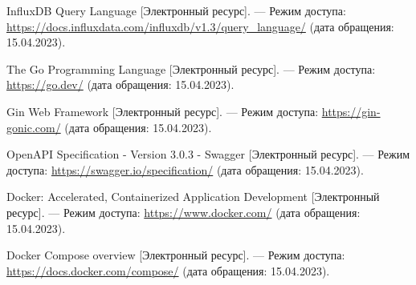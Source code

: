 \begin{thebibliography}{}
	 InfluxDB Query Language [Электронный ресурс]. — Режим доступа: \url{https://docs.influxdata.com/influxdb/v1.3/query_language/} (дата обращения: 15.04.2023).
	 
	 The Go Programming Language [Электронный ресурс]. — Режим доступа: \url{https://go.dev/} (дата обращения: 15.04.2023).
	 
	 Gin Web Framework [Электронный ресурс]. — Режим доступа: \url{https://gin-gonic.com/} (дата обращения: 15.04.2023).
	 
	 OpenAPI Specification - Version 3.0.3 - Swagger [Электронный ресурс]. — Режим доступа: \url{https://swagger.io/specification/} (дата обращения: 15.04.2023).
	 
	 Docker: Accelerated, Containerized Application Development [Электронный ресурс]. — Режим доступа: \url{https://www.docker.com/} (дата обращения: 15.04.2023).
	 
	 Docker Compose overview [Электронный ресурс]. — Режим доступа: \url{https://docs.docker.com/compose/} (дата обращения: 15.04.2023).
\end{thebibliography}
\endgroup

\pagebreak